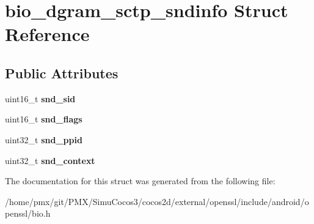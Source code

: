 \hypertarget{structbio__dgram__sctp__sndinfo}{}\section{bio\+\_\+dgram\+\_\+sctp\+\_\+sndinfo Struct Reference}
\label{structbio__dgram__sctp__sndinfo}
\subsection*{Public Attributes}
\begin{DoxyCompactItemize}
\item 
\mbox{\label{structbio__dgram__sctp__sndinfo_ab22988d5927028b0284c6cf18ff589dc}} 
uint16\+\_\+t {\bfseries snd\+\_\+sid}
\item 
\mbox{\label{structbio__dgram__sctp__sndinfo_ac0269a06039c3f2a59a258eabf0648d6}} 
uint16\+\_\+t {\bfseries snd\+\_\+flags}
\item 
\mbox{\label{structbio__dgram__sctp__sndinfo_a63933a21b96198ede95c5ab03b4884a1}} 
uint32\+\_\+t {\bfseries snd\+\_\+ppid}
\item 
\mbox{\label{structbio__dgram__sctp__sndinfo_a64de10bcaaadde29adef5a53ec28d9b3}} 
uint32\+\_\+t {\bfseries snd\+\_\+context}
\end{DoxyCompactItemize}


The documentation for this struct was generated from the following file\+:\begin{DoxyCompactItemize}
\item 
/home/pmx/git/\+P\+M\+X/\+Simu\+Cocos3/cocos2d/external/openssl/include/android/openssl/bio.\+h\end{DoxyCompactItemize}

